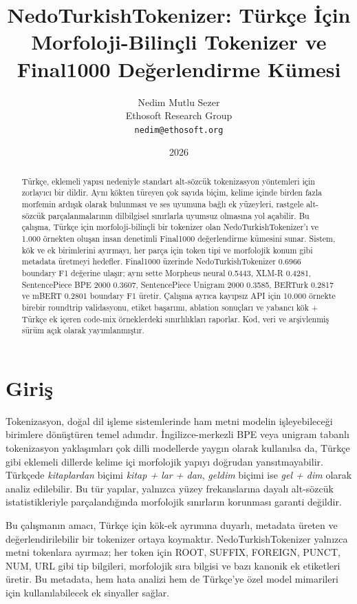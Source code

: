 \documentclass[11pt]{article}
\title{NedoTurkishTokenizer: Türkçe İçin Morfoloji-Bilinçli Tokenizer ve Final1000 Değerlendirme Kümesi}
\author{Nedim Mutlu Sezer\\Ethosoft Research Group\\\texttt{nedim@ethosoft.org}}
\date{2026}
\begin{document}
\maketitle

\begin{abstract}
Türkçe, eklemeli yapısı nedeniyle standart alt-sözcük tokenizasyon yöntemleri için zorlayıcı bir dildir. Aynı kökten türeyen çok sayıda biçim, kelime içinde birden fazla morfemin ardışık olarak bulunması ve ses uyumuna bağlı ek yüzeyleri, rastgele alt-sözcük parçalanmalarının dilbilgisel sınırlarla uyumsuz olmasına yol açabilir. Bu çalışma, Türkçe için morfoloji-bilinçli bir tokenizer olan NedoTurkishTokenizer'ı ve 1.000 örnekten oluşan insan denetimli Final1000 değerlendirme kümesini sunar. Sistem, kök ve ek birimlerini ayırmayı, her parça için token tipi ve morfolojik konum gibi metadata üretmeyi hedefler. Final1000 üzerinde NedoTurkishTokenizer 0.6966 boundary F1 değerine ulaşır; aynı sette Morpheus neural 0.5443, XLM-R 0.4281, SentencePiece BPE 2000 0.3607, SentencePiece Unigram 2000 0.3585, BERTurk 0.2817 ve mBERT 0.2801 boundary F1 üretir. Çalışma ayrıca kayıpsız API için 10.000 örnekte birebir roundtrip validasyonu, etiket başarımı, ablation sonuçları ve yabancı kök + Türkçe ek içeren code-mix örneklerdeki sınırlılıkları raporlar. Kod, veri ve arşivlenmiş sürüm açık olarak yayımlanmıştır.
\end{abstract}

\section{Giriş}
Tokenizasyon, doğal dil işleme sistemlerinde ham metni modelin işleyebileceği birimlere dönüştüren temel adımdır. İngilizce-merkezli BPE veya unigram tabanlı tokenizasyon yaklaşımları çok dilli modellerde yaygın olarak kullanılsa da, Türkçe gibi eklemeli dillerde kelime içi morfolojik yapıyı doğrudan yansıtmayabilir. Türkçede \emph{kitaplardan} biçimi \emph{kitap + lar + dan}, \emph{geldim} biçimi ise \emph{gel + dim} olarak analiz edilebilir. Bu tür yapılar, yalnızca yüzey frekanslarına dayalı alt-sözcük istatistikleriyle parçalandığında morfolojik sınırların korunması garanti değildir.

Bu çalışmanın amacı, Türkçe için kök-ek ayrımına duyarlı, metadata üreten ve değerlendirilebilir bir tokenizer ortaya koymaktır. NedoTurkishTokenizer yalnızca metni tokenlara ayırmaz; her token için ROOT, SUFFIX, FOREIGN, PUNCT, NUM, URL gibi tip bilgileri, morfolojik sıra bilgisi ve bazı kanonik ek etiketleri üretir. Bu metadata, hem hata analizi hem de Türkçe'ye özel model mimarileri için kullanılabilecek ek sinyaller sağlar.
\end{document}

